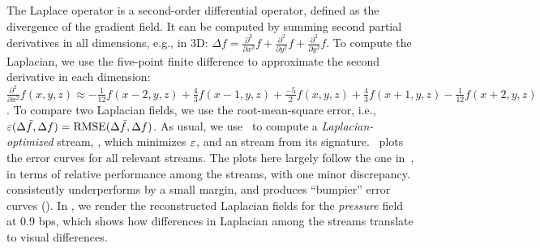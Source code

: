 The Laplace operator is a second-order differential operator, defined as the divergence of the
gradient field. It can be computed by summing second partial derivatives in all dimensions, e.g., in
3D: $\Delta
f=\frac{{\partial}^2}{\partial{x^2}}f+\frac{{\partial}^2}{\partial{y^2}}f+\frac{{\partial}^2}{\partial{y^2}}f$.
To compute the Laplacian, we use the five-point finite difference to approximate the second
derivative in each dimension: $\frac{{\partial}^2}{\partial{x^2}}f(x,y,z) \approx
-\frac{1}{12}f(x-2,y,z)+\frac{4}{3}f(x-1,y,z)+\frac{-5}{2}f(x,y,z)+\frac{4}{3}f(x+1,y,z)-\frac{1}{12}f(x+2,y,z)$.
To compare two Laplacian fields, we use the root-mean-square error, i.e., $\err(\Delta
\tilde{f},\Delta f)=\text{RMSE}(\Delta \tilde{f},\Delta f)$. As usual, we use~ to
compute a \emph{Laplacian-optimized} stream, \slop, which minimizes $\err$, and an \slsg stream from
its signature.~ plots the error curves for all relevant
streams. The plots here largely follow the one in~, in terms of
relative performance among the streams, with one minor discrepancy. \sbit consistently underperforms
\slsg by a small margin, and produces ``bumpier'' error curves (). In
, we render the reconstructed Laplacian fields for the
\emph{pressure} field at 0.9 bps, which shows how differences in Laplacian among the streams
translate to visual differences.

